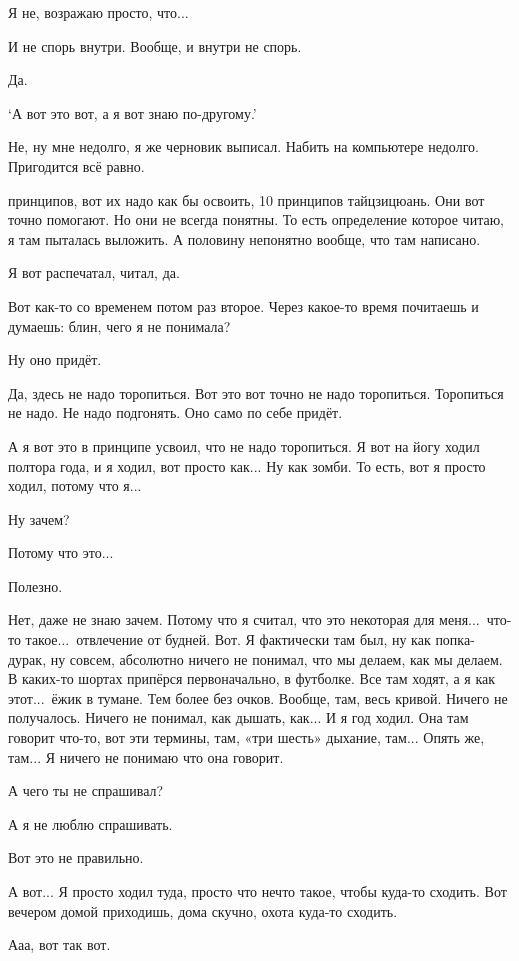 \I
Я не, возражаю просто, что...

\M
И не спорь внутри. Вообще, и внутри не спорь.

\I
Да.

\M
`А вот это вот, а я вот знаю по-другому.'

\I
Не, ну мне недолго, я же черновик выписал.
Набить на компьютере недолго. Пригодится всё равно.

 принципов, вот их надо как бы освоить, 10 принципов тайцзицюань. Они вот точно помогают.
Но они не всегда понятны. То есть определение которое
читаю, я там пыталась выложить. А половину непонятно
вообще, что там написано.

\I
Я вот распечатал, читал, да.

\M
Вот как-то со временем потом {\csc раз} второе. Через какое-то время почитаешь и думаешь:
блин, чего я не понимала?

\I
Ну оно придёт.

\M
Да, здесь не надо торопиться.
Вот это вот точно не надо торопиться.
Торопиться не надо. Не надо подгонять.
Оно само по себе придёт.

\I
А я вот это в принципе усвоил, что не надо торопиться. Я вот на йогу ходил полтора года,
и я ходил, вот просто как... Ну как зомби. То есть, вот я
просто ходил, потому что я...

\M
Ну зачем?

\I
Потому что это...

\M
Полезно.

\I
Нет, даже не знаю зачем.
Потому что я считал, что это некоторая для меня...\ что-то такое...\ отвлечение от будней.
Вот. Я фактически там был, ну как попка-дурак, ну совсем,
абсолютно ничего не понимал, что мы делаем, как мы делаем.
В каких-то шортах припёрся первоначально, в футболке. Все там ходят, а я как этот...\ ёжик
в тумане.
Тем более без очков.
Вообще, там, весь кривой.
Ничего не получалось.
Ничего не понимал, как дышать, как... И я год ходил.
Она там говорит что-то, вот эти термины, там, «три шесть» дыхание, там...
Опять же, там...
Я ничего не понимаю что она говорит.

\M
А чего ты не спрашивал?

\I
А я не люблю спрашивать.

\M
Вот это не правильно.

\I
А вот...
Я просто ходил туда, просто что нечто такое, чтобы куда-то сходить.
Вот вечером домой приходишь, дома скучно, охота куда-то сходить.

\M
Ааа, вот так вот.

